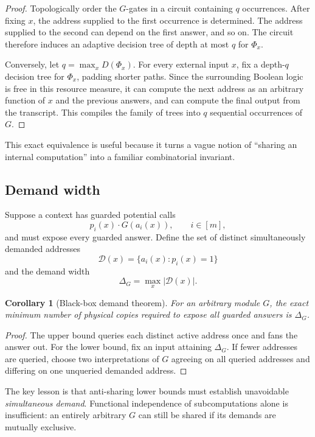 \documentclass[11pt]{article}
\newtheorem{corollary}[theorem]{Corollary}
\theoremstyle{definition}
\begin{document}
\begin{proof}
Topologically order the $G$-gates in a circuit containing $q$ occurrences.  After fixing $x$, the address supplied to the first occurrence is determined.  The address supplied to the second can depend on the first answer, and so on.  The circuit therefore induces an adaptive decision tree of depth at most $q$ for $\Phi_x$.

Conversely, let $q=\max_xD(\Phi_x)$.  For every external input $x$, fix a depth-$q$ decision tree for $\Phi_x$, padding shorter paths.  Since the surrounding Boolean logic is free in this resource measure, it can compute the next address as an arbitrary function of $x$ and the previous answers, and can compute the final output from the transcript.  This compiles the family of trees into $q$ sequential occurrences of $G$.
\end{proof}

This exact equivalence is useful because it turns a vague notion of ``sharing an internal computation'' into a familiar combinatorial invariant.

\subsection{Demand width}

Suppose a context has guarded potential calls
\[
  p_i(x)\cdot G(a_i(x)),\qquad i\in[m],
\]
and must expose every guarded answer.  Define the set of distinct simultaneously demanded addresses
\[
  \mathcal D(x)=\{a_i(x):p_i(x)=1\}
\]
and the demand width
\[
  \Delta_G=\max_x|\mathcal D(x)|.
\]

\begin{corollary}[Black-box demand theorem]\label{cor:demand}
For an arbitrary module $G$, the exact minimum number of physical copies required to expose all guarded answers is $\Delta_G$.
\end{corollary}

\begin{proof}
The upper bound queries each distinct active address once and fans the answer out.  For the lower bound, fix an input attaining $\Delta_G$.  If fewer addresses are queried, choose two interpretations of $G$ agreeing on all queried addresses and differing on one unqueried demanded address.
\end{proof}

The key lesson is that anti-sharing lower bounds must establish unavoidable \emph{simultaneous demand}.  Functional independence of subcomputations alone is insufficient: an entirely arbitrary $G$ can still be shared if its demands are mutually exclusive.
\end{document}
